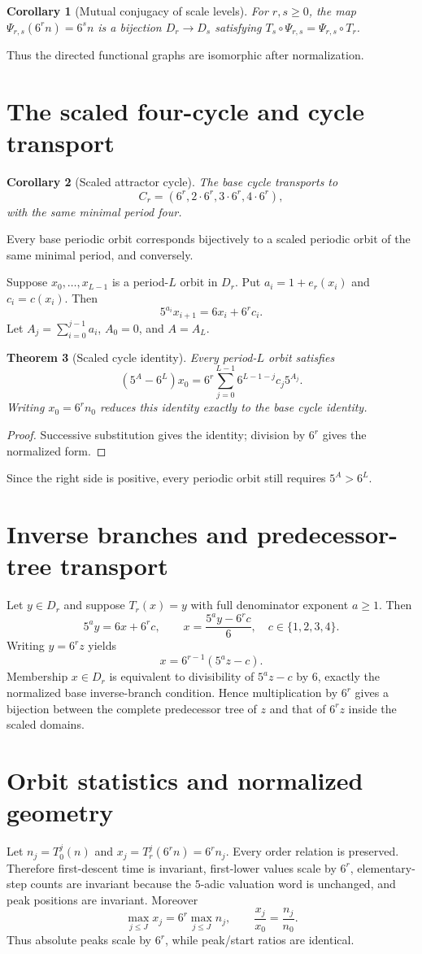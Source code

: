 \documentclass[11pt]{article}
\newtheorem{theorem}{Theorem}[section]
\newtheorem{corollary}[theorem]{Corollary}
\theoremstyle{remark}\newtheorem{remark}[theorem]{Remark}\newtheorem{example}[theorem]{Example}
\begin{document}
\begin{corollary}[Mutual conjugacy of scale levels]
For $r,s\ge0$, the map $\Psi_{r,s}(6^rn)=6^sn$ is a bijection $D_r\to D_s$ satisfying
$T_s\circ\Psi_{r,s}=\Psi_{r,s}\circ T_r$.
\end{corollary}
Thus the directed functional graphs are isomorphic after normalization.

\section{The scaled four-cycle and cycle transport}
\begin{corollary}[Scaled attractor cycle]
The base cycle transports to
\[
C_r=(6^r,2\cdot6^r,3\cdot6^r,4\cdot6^r),
\]
with the same minimal period four.
\end{corollary}
Every base periodic orbit corresponds bijectively to a scaled periodic orbit of the same minimal period, and conversely.

Suppose $x_0,\ldots,x_{L-1}$ is a period-$L$ orbit in $D_r$. Put $a_i=1+e_r(x_i)$ and $c_i=c(x_i)$. Then
\[
5^{a_i}x_{i+1}=6x_i+6^rc_i.
\]
Let $A_j=\sum_{i=0}^{j-1}a_i$, $A_0=0$, and $A=A_L$.
\begin{theorem}[Scaled cycle identity]
Every period-$L$ orbit satisfies
\[
(5^A-6^L)x_0=6^r\sum_{j=0}^{L-1}6^{L-1-j}c_j5^{A_j}.
\]
Writing $x_0=6^rn_0$ reduces this identity exactly to the base cycle identity.
\end{theorem}
\begin{proof}Successive substitution gives the identity; division by $6^r$ gives the normalized form.\end{proof}
Since the right side is positive, every periodic orbit still requires $5^A>6^L$.

\section{Inverse branches and predecessor-tree transport}
Let $y\in D_r$ and suppose $T_r(x)=y$ with full denominator exponent $a\ge1$. Then
\[
5^ay=6x+6^rc,
\qquad x=\frac{5^ay-6^rc}{6},\quad c\in\{1,2,3,4\}.
\]
Writing $y=6^rz$ yields
\[
x=6^{r-1}(5^az-c).
\]
Membership $x\in D_r$ is equivalent to divisibility of $5^az-c$ by $6$, exactly the normalized base inverse-branch condition. Hence multiplication by $6^r$ gives a bijection between the complete predecessor tree of $z$ and that of $6^rz$ inside the scaled domains.

\section{Orbit statistics and normalized geometry}
Let $n_j=T_0^j(n)$ and $x_j=T_r^j(6^rn)=6^rn_j$.
Every order relation is preserved. Therefore first-descent time is invariant, first-lower values scale by $6^r$, elementary-step counts are invariant because the $5$-adic valuation word is unchanged, and peak positions are invariant. Moreover
\[
\max_{j\le J}x_j=6^r\max_{j\le J}n_j,
\qquad \frac{x_j}{x_0}=\frac{n_j}{n_0}.
\]
Thus absolute peaks scale by $6^r$, while peak/start ratios are identical.
\end{document}
